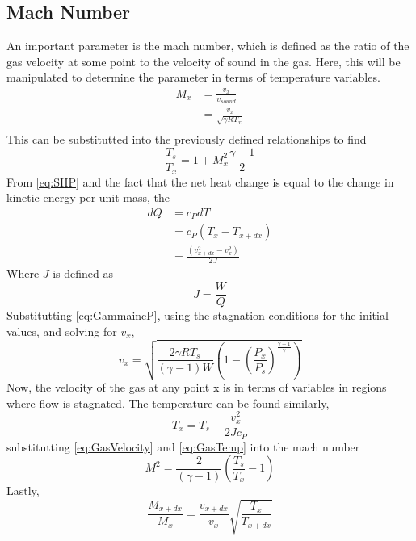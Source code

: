 \subsection{Mach Number}
An important parameter is the mach number, which is defined as the ratio of the gas velocity at some point to the velocity of sound in the gas. Here, this will be manipulated to determine the parameter in terms of temperature variables.
\begin{align}\label{eq:DefineMach}
M_x&=\frac{v_x}{v_{sound}}\\
&=\frac{v_x}{\sqrt{\gamma R T_x}}\\
\end{align}%
This can be substitutted into the previously defined relationships to find
\begin{equation}\label{eq:1.25}
\frac{T_s}{T_x}=1+M_x^2\frac{\gamma-1}{2}
\end{equation}
From \ref{eq:SHP} and the fact that the net heat change is equal to the change in kinetic energy per unit mass, the
\begin{align}
dQ&=c_PdT\\
&=c_P(T_x-T_{x+dx})\\
&=\frac{(v_{x+dx}^2-v_x^2)}{2J}
\end{align}
Where $J$ is defined as
\begin{equation}
J=\frac{W}{Q}
\end{equation}%
Substitutting \ref{eq:GammaincP}, using the stagnation conditions for the initial values, and solving for $v_x$,
\begin{equation}\label{eq:GasVelocity}
v_x=\sqrt{\frac{2\gamma RT_s}{(\gamma-1)W}\left(1-\left(\frac{P_x}{P_s}\right)^{\frac{\gamma-1}{\gamma}}\right)}
\end{equation}
Now, the velocity of the gas at any point x is in terms of variables in regions where flow is stagnated. The temperature can be found similarly,
\begin{equation}\label{eq:GasTemp}
T_x=T_s-\frac{v_x^2}{2Jc_P}
\end{equation}
substitutting \ref{eq:GasVelocity} and \ref{eq:GasTemp} into the mach number
\begin{equation}\label{eq:MachInTermsofT}
M^2=\frac{2}{(\gamma-1)}\left(\frac{T_s}{T_x}-1\right)
\end{equation}
Lastly,
\begin{equation}\label{eq:MRatio}
\frac{M_{x+dx}}{M_x}=\frac{v_{x+dx}}{v_x}\sqrt{\frac{T_x}{T_{x+dx}}}
\end{equation}
